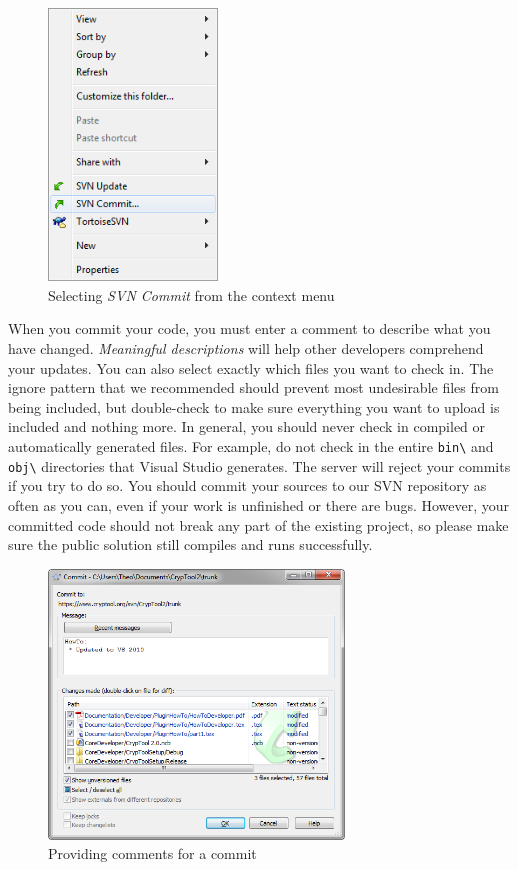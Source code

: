 \begin{figure}[h!]
	\centering
		\includegraphics[width=0.40\textwidth]{figures/tortoise_svn_commit.png}
	\caption{Selecting \textit{SVN Commit} from the context menu}
	\label{fig:tortoise_svn_commit}
\end{figure}
\clearpage

When you commit your code, you must enter a comment to describe what you have changed. \textit{Meaningful descriptions} will help other developers comprehend your updates. You can also select exactly which files you want to check in. The ignore pattern that we recommended should prevent most undesirable files from being included, but double-check to make sure everything you want to upload is included and nothing more. In general, you should never check in compiled or automatically generated files. For example, do not check in the entire \texttt{bin\textbackslash} and \texttt{obj\textbackslash} directories that Visual Studio generates. The server will reject your commits if you try to do so. You should commit your sources to our SVN repository as often as you can, even if your work is unfinished or there are bugs. However, your committed code should not break any part of the existing project, so please make sure the public solution still compiles and runs successfully.

\begin{figure}[h!]
	\centering
		\includegraphics[width=0.70\textwidth]{figures/tortoise_svn_commit_window.png}
	\caption{Providing comments for a commit}
	\label{fig:tortoise_svn_commit2}
\end{figure}

